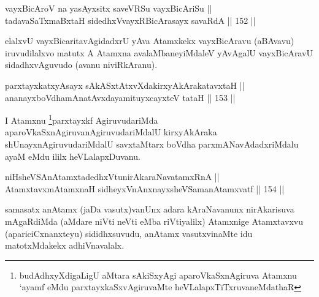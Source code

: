 
\begin{shl}
vayxBicAroV na yasAyxsitx saveVRSu vayxBicAriSu || \\
tadavaSaTxmaBxtaH sidedhxVvayxRBicArasayx savaRdA \hfill || 152 || 
\end{shl}

\begin{artha}
elalxvU vayxBicaritavAgidadxrU yAva Atamxkekx vayxBicAravu (aBAvavu) iruvudilalxvo matutx A Atamxna avalaMbaneyiMdaleV yAvAgalU vayxBicAravU sidadhxvAguvudo (avanu niviRkAranu).
\end{artha}


\begin{shl}
parxtayxkatxyA\s sayx sAkASxtAtxvXdakirxyAkArakatavxtaH ||  \\
ananayxboVdhamAnatAvxdayamituyxcayxteV tataH \hfill || 153 ||  
\end{shl}

\begin{artha}
I Atamxnu \footnote{budAdhxyXdigaLigU aMtara sAkiSxyAgi aparoVkaSxnAgiruva Atamxnu `ayamf eMdu parxtayxkaSxvAgiruvaMte heVLalapxTiTxruvaneMdathaR}parxtayxkf AgiruvudariMda aparoVkaSxnAgiruvanAgiruvudariMdalU kirxyAkAraka shUnayxnAgiruvudariMdalU savxtaMtarx boVdha parxmANavAdadxriMdalu ayaM eMdu ililx heVLalapxDuvanu.
\end{artha}


\begin{shl}
niHsheVSAnAtamxtadedhxVtunirAkaraNavatamxRnA || \\
AtamxtavxmAtamxnaH sidheyxVnAnxnayxsheVSamanAtamxvatf \hfill || 154 ||  
\end{shl}

\begin{artha}
samasatx anAtamx (jaDa vasutx)vanUnx adara kAraNavanunx nirAkarisuva
mAgaRdiMda (aMdare niVti neVti eMba riVtiyalilx) Atamxnige Atamxtavxvu
(apariciCxnanxteyu) sididhxsuvudu, anAtamx vasutxvinaMte idu
matotxMdakekx adhiVnavalalx.
\end{artha}



